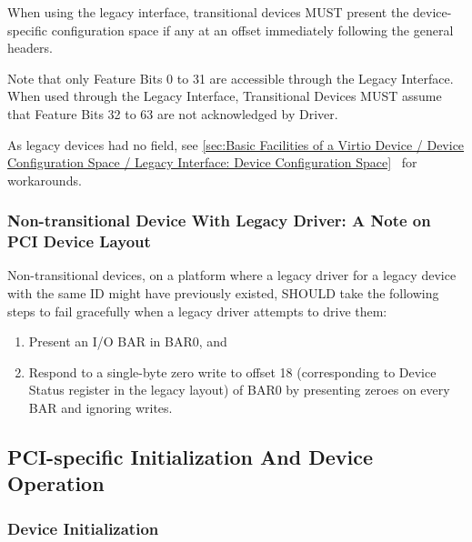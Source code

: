 When using the legacy interface, transitional
devices MUST present the device-specific configuration space
if any at an offset immediately following the general headers.

Note that only Feature Bits 0 to 31 are accessible through the
Legacy Interface. When used through the Legacy Interface,
Transitional Devices MUST assume that Feature Bits 32 to 63
are not acknowledged by Driver.

As legacy devices had no  field,
see \ref{sec:Basic Facilities of a Virtio Device / Device
Configuration Space / Legacy Interface: Device Configuration
Space}~ for workarounds.

\subsubsection{Non-transitional Device With Legacy Driver: A Note
on PCI Device Layout}\label{sec:Virtio Transport Options / Virtio
Over PCI Bus / PCI Device Layout / Non-transitional Device With
Legacy Driver: A Note on PCI Device Layout}

Non-transitional devices, on a platform where a legacy driver for
a legacy device with the same ID might have previously existed,
SHOULD take the following steps to fail gracefully when a legacy
driver attempts to drive them:

\begin{enumerate}
\item Present an I/O BAR in BAR0, and
\item Respond to a single-byte zero write to offset 18
   (corresponding to Device Status register in the legacy layout)
   of BAR0 by presenting zeroes on every BAR and ignoring writes.
\end{enumerate}

\subsection{PCI-specific Initialization And Device Operation}\label{sec:Virtio Transport Options / Virtio Over PCI Bus / PCI-specific Initialization And Device Operation}

\subsubsection{Device Initialization}\label{sec:Virtio Transport Options / Virtio Over PCI Bus / PCI-specific Initialization And Device Operation / Device Initialization}

